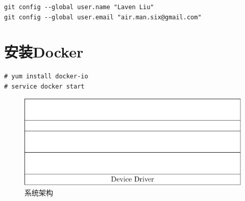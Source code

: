 \begin{verbatim}
git config --global user.name "Laven Liu"
git config --global user.email "air.man.six@gmail.com"
\end{verbatim}

\section{安装Docker}

\begin{verbatim}
# yum install docker-io
# service docker start
\end{verbatim}

\begin{figure}[hbtp]
  \centering
  \includegraphics{graph/os-arch-mps.pdf}
    \caption{系统架构}
  \label{fig:OSArch}
\end{figure}
